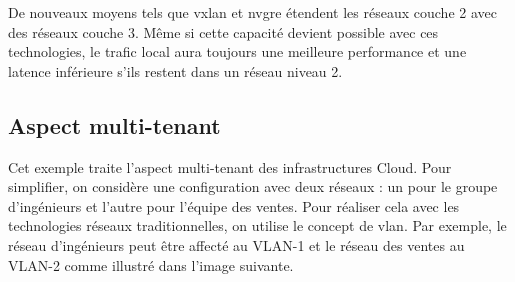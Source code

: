 
De nouveaux moyens tels que  \gls{vxlan} et \gls{nvgre} étendent les réseaux couche 2 avec des réseaux couche 3. Même si cette capacité devient possible avec ces technologies, le trafic local aura toujours une meilleure performance et une latence inférieure s'ils restent dans un réseau niveau 2. 
\cite{hpCloudEffectsOnNetworkChanging} \cite{vm7Challenges} \cite{zkCloudArrived}






\subsection{Aspect multi-tenant}

Cet exemple traite l'aspect multi-tenant des infrastructures Cloud. Pour simplifier, on considère une configuration avec deux réseaux : un pour le groupe d'ingénieurs et l'autre pour l'équipe des ventes. Pour réaliser cela avec les technologies réseaux traditionnelles, on utilise le concept de \gls{vlan}. Par exemple, le réseau d'ingénieurs peut être affecté au VLAN-1 et le réseau des ventes au VLAN-2 comme illustré dans l'image suivante.


